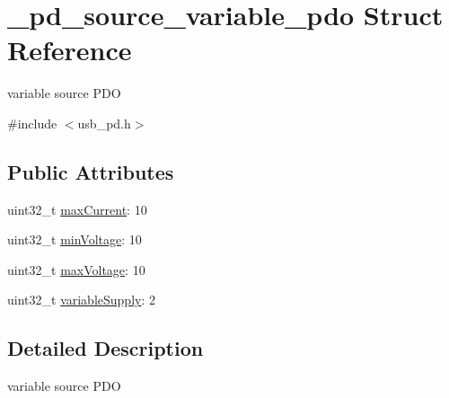 \hypertarget{struct__pd__source__variable__pdo}{\section{\-\_\-pd\-\_\-source\-\_\-variable\-\_\-pdo Struct Reference}
\label{struct__pd__source__variable__pdo}
}


variable source P\-D\-O  




{\ttfamily \#include $<$usb\-\_\-pd.\-h$>$}

\subsection*{Public Attributes}
\begin{DoxyCompactItemize}
\item 
uint32\-\_\-t \hyperlink{struct__pd__source__variable__pdo_a8a24367204d3381f0670311a88c0b2e6}{max\-Current}\-: 10
\item 
uint32\-\_\-t \hyperlink{struct__pd__source__variable__pdo_a713018c825f51d1a6a7186582b40a106}{min\-Voltage}\-: 10
\item 
uint32\-\_\-t \hyperlink{struct__pd__source__variable__pdo_a493ced8078579d68ade7dfbce819b4d1}{max\-Voltage}\-: 10
\item 
uint32\-\_\-t \hyperlink{struct__pd__source__variable__pdo_a47233d0cd3de38e33422b8e107a6ff9d}{variable\-Supply}\-: 2
\end{DoxyCompactItemize}


\subsection{Detailed Description}
variable source P\-D\-O 

